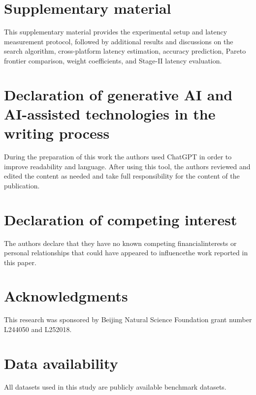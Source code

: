 \documentclass[a4paper,fleqn]{cas-sc}
\begin{document}
\appendix
\section{Supplementary material}
This supplementary material provides the experimental setup and latency measurement protocol, followed by additional results and discussions on the search algorithm, cross-platform latency estimation, accuracy prediction, Pareto frontier comparison, weight coefficients, and Stage-II latency evaluation.

\printcredits

\section*{Declaration of generative AI and AI-assisted technologies in the 
writing process}
During the preparation of this work the authors used ChatGPT in order to improve readability and language. After using this tool, the authors reviewed and edited the content as needed and take full responsibility for the content of the publication.

\section*{Declaration of competing interest}
The authors declare that they have no known competing financialinterests or personal relationships that could have appeared to influencethe work reported in this paper.

\section*{Acknowledgments}
This research was sponsored by Beijing Natural Science Foundation grant number L244050 and L252018.

\section*{Data availability}
All datasets used in this study are publicly available benchmark datasets.

%





\end{document}
